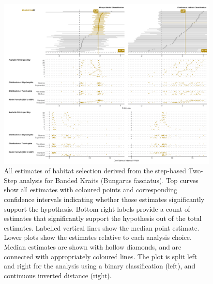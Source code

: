 \documentclass[10pt,a4paper]{article}
\begin{document}
\begin{figure}
\includegraphics[width=1\linewidth]{../../figures/specCurve_Banded Krait_twoStep} \caption{All estimates of habitat selection derived from the step-based Two-Step analysis for Banded Kraits (Bungarus fasciatus). Top curves show all estimates with coloured points and corresponding confidence intervals indicating whether those estimates significantly support the hypothesis. Bottom right labels provide a count of estimates that significantly support the hypothesis out of the total estimates. Labelled vertical lines show the median point estimate. Lower plots show the estimates relative to each analysis choice. Median estimates are shown with hollow diamonds, and are connected with appropriately coloured lines. The plot is split left and right for the analysis using a binary classification (left), and continuous inverted distance (right).}\label{fig:specCurveTwoStepBUFA}
\end{figure}
\end{document}
